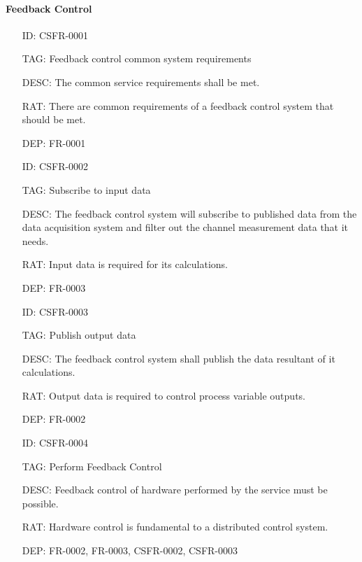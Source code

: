       \paragraph{Feedback Control}

        \begin{itemize}
          \setlength{\itemindent}{.5in}
          \itemsep .15em
          \item[ID:] CSFR-0001
          \item[TAG:] Feedback control common system requirements
          \item[DESC:] The common service requirements shall be met.
          \item[RAT:] There are common requirements of a feedback control system
            that should be met.
          \item[DEP:] FR-0001
        \end{itemize}

        \begin{itemize}
          \setlength{\itemindent}{.5in}
          \itemsep .15em
          \item[ID:] CSFR-0002
          \item[TAG:] Subscribe to input data
          \item[DESC:] The feedback control system will subscribe to
            published data from the data acquisition system and filter out
            the channel measurement data that it needs.
          \item[RAT:] Input data is required for its calculations.
          \item[DEP:] FR-0003
        \end{itemize}

        \begin{itemize}
          \setlength{\itemindent}{.5in}
          \itemsep .15em
          \item[ID:] CSFR-0003
          \item[TAG:] Publish output data
          \item[DESC:] The feedback control system shall publish the data
            resultant of it calculations.
          \item[RAT:] Output data is required to control process variable
            outputs.
          \item[DEP:] FR-0002
        \end{itemize}

        \begin{itemize}
          \setlength{\itemindent}{.5in}
          \itemsep .15em
          \item[ID:] CSFR-0004
          \item[TAG:] Perform Feedback Control
          \item[DESC:] Feedback control of hardware performed by the service
            must be possible.
          \item[RAT:] Hardware control is fundamental to a distributed
            control system.
          \item[DEP:] FR-0002, FR-0003, CSFR-0002, CSFR-0003
        \end{itemize}

